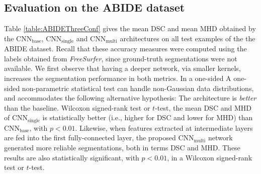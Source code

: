 \documentclass[twoside,fleqn,espcrc2]{elsarticle}
\newcommand{\CNNbase}{\mr{CNN}_\mr{base}}
\newcommand{\CNNsingle}{\mr{CNN}_\mr{single}}
\newcommand{\CNNmulti}{\mr{CNN}_\mr{multi}}
\newcommand{\mr}[1]{\mathrm{#1}}
\newcommand{\FreeSurfer}{\textit{FreeSurfer}}
\begin{document}
\subsection{Evaluation on the ABIDE dataset}
\label{ssec:ABIDEDatRes}

Table \ref{table:ABIDEThreeConf} gives the mean DSC and mean MHD obtained by the $\CNNbase$, $\CNNsingle$ and $\CNNmulti$ architectures on all test examples of the the ABIDE dataset. Recall that these accuracy measures were computed using the labels obtained from \FreeSurfer{}, since ground-truth segmentations were not available. 
We first observe that having a deeper network, via smaller kernels, increases the segmentation performance in both metrics. In a one-sided A one-sided non-parametric statistical test can handle non-Gaussian data distributions, and accommodates the following alternative hypothesis: The architecture is \emph{better} than the baseline. Wilcoxon signed-rank test or $t$-test, the mean DSC and MHD of $\CNNsingle$ is statistically better (i.e., higher for DSC and lower for MHD) than $\CNNbase$, with $p < 0.01$. Likewise, when features extracted at intermediate layers are fed into the first fully-connected layer, the proposed $\CNNmulti$ network generated more reliable segmentations, both in terms DSC and MHD. These results are also statistically significant, with $p < 0.01$, in a Wilcoxon signed-rank test or $t$-test.
\end{document}
